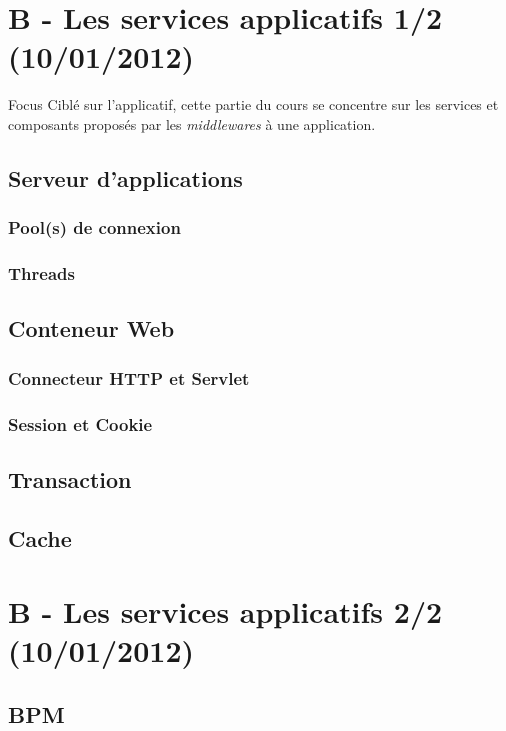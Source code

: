 \newpage

\section{B - Les services applicatifs 1/2 (10/01/2012)}
\begin{frame}
  \begin{block}{Focus}
    Ciblé sur l'applicatif, cette partie du cours se concentre sur les
    services et composants proposés par les \textit{middlewares} à une
    application.
  \end{block}
\end{frame}
\subsection{Serveur d'applications}
\subsubsection{Pool(s) de connexion}
\subsubsection{Threads}

\subsection{Conteneur Web}
\subsubsection{Connecteur HTTP et Servlet}
\subsubsection{Session et Cookie}

\subsection{Transaction}

\subsection{Cache}

\section{B - Les services applicatifs 2/2 (10/01/2012)}
\subsection{BPM}

